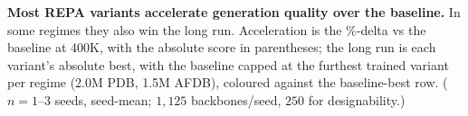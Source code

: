 \begin{table}[tbp]
\centering
\small

\caption{\textbf{Most REPA variants accelerate generation quality over the baseline.} In some regimes they also win the long run. Acceleration is the \%-delta vs the baseline at 400K, with the absolute score in parentheses; the long run is each variant's absolute best, with the baseline capped at the furthest trained variant per regime (2.0M PDB, 1.5M AFDB), coloured against the baseline-best row. ($n{=}1$--$3$ seeds, seed-mean; $1{,}125$ backbones/seed, $250$ for designability.)}
\label{tab:proteina-speedup}
\end{table}
